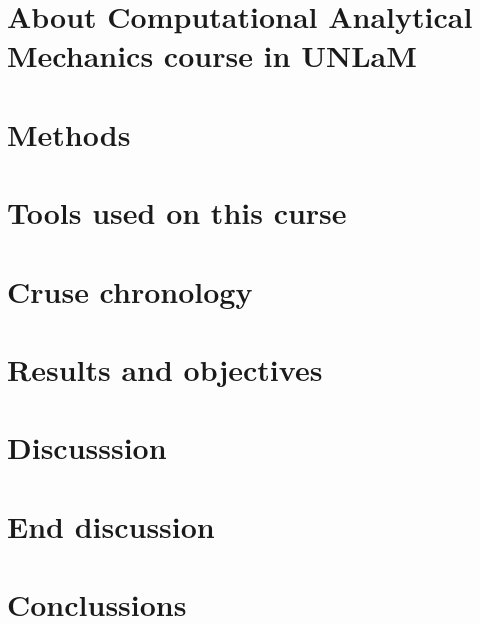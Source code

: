 \documentclass[journal]{IEEEtran}
\begin{document}
\section{About Computational Analytical Mechanics course in UNLaM}



\section{Methods}



\section{Tools used on this curse}



\section{Cruse chronology}



\section{Results and objectives}



\section{Discusssion}



\section{End discussion}



\section{Conclussions}


\end{document}
